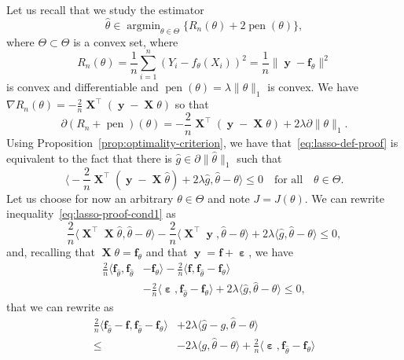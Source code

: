 \documentclass[
	fontsize=11pt, %
	twoside=false, %
	numbers=noenddot, %
]{kaobook}
\DeclareMathOperator{\bX}{{\boldsymbol X}}
\renewcommand{\bf}{{\boldsymbol f}}
\DeclareMathOperator{\by}{{\boldsymbol y}}
\DeclareMathOperator{\beps}{\boldsymbol \varepsilon}
\DeclareMathOperator{\pen}{pen}
\DeclareMathOperator*{\argmin}{argmin}
\newcommand{\wh}{\widehat}
\newcommand{\grad}{\nabla}
\newcommand{\norm}[1]{\| #1 \|}
\newcommand{\inr}[1]{\langle #1 \rangle}
\begin{document}
Let us recall that we study the estimator
\begin{equation}
	\label{eq:lasso-def-proof}
	\wh \theta \in \argmin_{\theta \in \Theta} \big\{ R_n(\theta) + 2 \pen(\theta) \big\},
\end{equation}
where $\Theta \subset \Theta$ is a convex set, where 
\begin{equation*}
	R_n(\theta) = \frac 1n \sum_{i=1}^n (Y_i - f_\theta(X_i))^2	
	= \frac 1n \norm{\by - \bf_{\theta}}^2
\end{equation*}
is convex and differentiable and $\pen(\theta) = \lambda \norm{\theta}_1$ is convex.
We have $\grad R_n(\theta) = - \frac 2n \bX^\top (\by - \bX \theta)$ so that
\begin{equation*}
	\partial(R_n + \pen)(\theta) = - \frac 2n \bX^\top (\by - \bX \theta) + 2 \lambda 
	\partial \norm{\theta}_1.
\end{equation*}
Using Proposition~\ref{prop:optimality-criterion}, we have that~\eqref{eq:lasso-def-proof} is equivalent to the fact that there is $\wh g \in \partial \norm{\wh \theta}_1$ such that
\begin{equation}
	\label{eq:lasso-proof-cond1}
	\Big \langle - \frac 2n \bX^\top (\by - \bX \wh \theta) + 2 \lambda \wh g, \wh \theta - \theta \Big \rangle \leq 0 \quad \text{for all} \quad \theta \in \Theta.
\end{equation}
Let us choose for now an arbitrary $\theta \in \Theta$ and note $J = J(\theta)$.
We can rewrite inequality~\eqref{eq:lasso-proof-cond1} as
\begin{equation*}
	\frac 2n \big \langle  \bX^\top \bX \wh \theta, \wh \theta - \theta \big \rangle 
	- \frac 2n \big \langle \bX^\top \by, \wh \theta - \theta \big \rangle
	+ 2 \lambda \inr{\wh g, \wh \theta - \theta} \leq 0,
\end{equation*}
and, recalling that $\bX \theta = \bf_\theta$ and that $\by = \bf + \beps$, we have
\begin{align*}
	\frac 2n \langle \bf_{\wh \theta}, \bf_{\wh \theta} &- \bf_{\theta} \rangle 
	- \frac 2n  \inr{\bf,  \bf_{\wh \theta} - \bf_\theta} \\
	&- \frac 2n \inr{\beps, \bf_{\wh \theta} - \bf_\theta}
	+ 2 \lambda \inr{\wh g, \wh \theta - \theta} \leq 0,
\end{align*}
that we can rewrite as 
\begin{align*}
	\frac 2n \inr{ \bf_{\wh \theta} - \bf, \bf_{\wh \theta} - \bf_{\theta}}
	&+ 2 \lambda  \inr{\wh g - g, \wh \theta - \theta} \\
	\leq &- 2 \lambda  \inr{g, \wh \theta - \theta} 
	+ \frac 2n  \inr{\beps,  \bf_{\wh \theta} - \bf_\theta} 
\end{align*}
\end{document}
